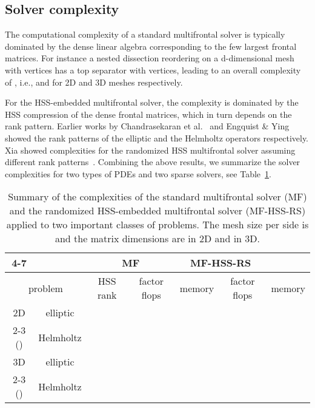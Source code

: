 \documentclass{article}
\begin{document}
\subsection{Solver complexity}
The computational complexity of a standard multifrontal solver is
typically dominated by the dense linear algebra corresponding to the
few largest frontal matrices. For instance a nested dissection
reordering on a d-dimensional mesh with  vertices has a top
separator with  vertices, leading to an overall
complexity of , i.e., 
and  for 2D and 3D meshes respectively.

For the HSS-embedded multifrontal solver, the complexity is dominated
by the HSS compression of the dense frontal matrices, which in turn
depends on the rank pattern. Earlier works by Chandrasekaran et
al.~\cite{chandrasekaran2010numerical} and Engquist \&
Ying~\cite{eng11} showed the rank patterns of the elliptic and the
Helmholtz operators respectively. Xia showed complexities for the
randomized HSS multifrontal solver assuming different rank
patterns~\cite{xia2013randomized}. Combining the above results, we
summarize the solver complexities for two types of PDEs and two sparse
solvers, see Table~\ref{tab:solver_complexity}.




\begin{table}[htp!]\footnotesize
  \centering
\renewcommand{\arraystretch}{1.15}
  \setlength{\tabcolsep}{.2em}
  \begin{tabular}
    [c]{|c|c|c|c|c|c|c|}
    \cline{4-7}
    \multicolumn{2}{}{} & & \multicolumn{2}{c|}{MF} & \multicolumn{2}{|c|}{MF-HSS-RS}\\\hline
    \multicolumn{2}{|c|}{problem} & HSS rank
& factor flops & memory & factor flops & memory\\\hline \hline
    {2D} & elliptic &  & \multirow{2}{*}{} & \multirow{2}{*}{}
    & \multirow{2}{*}{} & \multirow{2}{*}{}\\\cline{2-3}
    ()& Helmholtz &  &  &  &  & \\\hline
    {3D} & elliptic &  & \multirow{2}{*}{} & \multirow{2}{*}{}
    & \multirow{2}{*}{} 
    & \multirow{2}{*}{}\\\cline{2-3}
    ()& Helmholtz &  &  &  &  & \\\hline
  \end{tabular}
\caption{\footnotesize Summary of the complexities of the standard multifrontal solver (MF)
    and the randomized HSS-embedded multifrontal solver (MF-HSS-RS) applied to two important classes of problems.
    The mesh size per side is  and the matrix dimensions are 
    in 2D and  in 3D.}
  \label{tab:solver_complexity}
\end{table}
\end{document}
